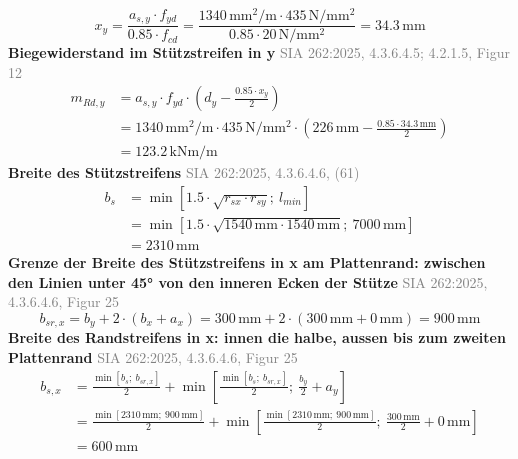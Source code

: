 \documentclass[11pt,a4paper]{article}
\newcommand{\normref}[1]{{\small\textcolor{gray}{#1}}}
\begin{document}
\begin{equation*}
x_y = \frac{a_{s,y} \cdot f_{yd}}{0.85 \cdot f_{cd}} = \frac{1340\,\mathrm{mm}^{2}/\mathrm{m} \cdot 435\,\mathrm{N}/\mathrm{mm}^{2}}{0.85 \cdot 20\,\mathrm{N}/\mathrm{mm}^{2}} = 34.3\,\mathrm{mm}
\end{equation*}
\noindent\textbf{Biegewiderstand im Stützstreifen in y} \hfill \normref{SIA 262:2025, 4.3.6.4.5; 4.2.1.5, Figur 12}
\begin{equation*}
\begin{aligned}
  m_{Rd,y} &= a_{s,y} \cdot f_{yd} \cdot \left(d_y - \frac{0.85 \cdot x_y}{2}\right) \\
  &= 1340\,\mathrm{mm}^{2}/\mathrm{m} \cdot 435\,\mathrm{N}/\mathrm{mm}^{2} \cdot \left(226\,\mathrm{mm} - \frac{0.85 \cdot 34.3\,\mathrm{mm}}{2}\right) \\
  &= 123.2\,\mathrm{kNm}/\mathrm{m}
\end{aligned}
\end{equation*}
\noindent\textbf{Breite des Stützstreifens} \hfill \normref{SIA 262:2025, 4.3.6.4.6, (61)}
\begin{equation*}
\begin{aligned}
  b_s &= \min\left[1.5 \cdot \sqrt{r_{sx} \cdot r_{sy}};\ l_{min}\right] \\
  &= \min\left[1.5 \cdot \sqrt{1540\,\mathrm{mm} \cdot 1540\,\mathrm{mm}};\ 7000\,\mathrm{mm}\right] \\
  &= 2310\,\mathrm{mm}
\end{aligned}
\end{equation*}
\noindent\textbf{Grenze der Breite des Stützstreifens in x am Plattenrand: zwischen den Linien unter 45° von den inneren Ecken der Stütze} \hfill \normref{SIA 262:2025, 4.3.6.4.6, Figur 25}
\begin{equation*}
b_{sr,x} = b_y + 2 \cdot \left(b_x + a_x\right) = 300\,\mathrm{mm} + 2 \cdot \left(300\,\mathrm{mm} + 0\,\mathrm{mm}\right) = 900\,\mathrm{mm}
\end{equation*}
\noindent\textbf{Breite des Randstreifens in x: innen die halbe, aussen bis zum zweiten Plattenrand} \hfill \normref{SIA 262:2025, 4.3.6.4.6, Figur 25}
\begin{equation*}
\begin{aligned}
  b_{s,x} &= \frac{\min\left[b_s;\ b_{sr,x}\right]}{2} + \min\left[\frac{\min\left[b_s;\ b_{sr,x}\right]}{2};\ \frac{b_y}{2} + a_y\right] \\
  &= \frac{\min\left[2310\,\mathrm{mm};\ 900\,\mathrm{mm}\right]}{2} + \min\left[\frac{\min\left[2310\,\mathrm{mm};\ 900\,\mathrm{mm}\right]}{2};\ \frac{300\,\mathrm{mm}}{2} + 0\,\mathrm{mm}\right] \\
  &= 600\,\mathrm{mm}
\end{aligned}
\end{equation*}
\end{document}
